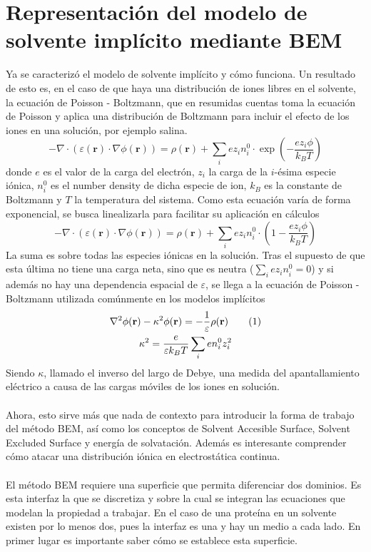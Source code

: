 \documentclass[12pt, twoside, onehalfspace, numbers, spanish]{ezthesis}
\newcommand\numberthis{\addtocounter{equation}{1}\tag{\theequation}}
\numberwithin{equation}{section}
\begin{document}
\section{Representación del modelo de solvente implícito mediante BEM}\label{Sec: Implicit_Solvent}
Ya se caracterizó el modelo de solvente implícito y cómo funciona. Un resultado de esto es, en el caso de que haya una distribución de iones libres en el solvente, la ecuación de Poisson - Boltzmann, que en resumidas cuentas toma la ecuación de Poisson y aplica una distribución de Boltzmann para incluir el efecto de los iones en una solución, por ejemplo salina.
\begin{equation}
-\nabla\cdot(\varepsilon(\mathbf{r})\cdot\nabla\phi(\mathbf{r})) = \rho(\mathbf{r}) + \sum_i ez_in_i^0\cdot \exp\left(-\frac{ez_i\phi}{k_BT}\right)
\end{equation}
donde $e$ es el valor de la carga del electrón, $z_i$ la carga de la $i$-ésima especie iónica, $n_i^0$ es el number density de dicha especie de ion, $k_B$ es la constante de Boltzmann y $T$ la temperatura del sistema. Como esta ecuación varía de forma exponencial, se busca linealizarla para facilitar su aplicación en cálculos
\begin{equation}
-\nabla\cdot(\varepsilon(\mathbf{r})\cdot\nabla\phi(\mathbf{r})) = \rho(\mathbf{r}) + \sum_i ez_in_i^0\cdot \left(1 - \frac{ez_i\phi}{k_BT}\right)
\end{equation}
La suma es sobre todas las especies iónicas en la solución. Tras el supuesto de que esta última no tiene una carga neta, sino que es neutra ($\sum_i ez_in_i^0 = 0$) y si además no hay una dependencia espacial de $\varepsilon$, se llega a la ecuación de Poisson - Boltzmann utilizada comúnmente en los modelos implícitos
\begin{gather*}
\nabla^2\phi(\mathbf{r}) - \kappa^2\phi(\mathbf{r}) = - \frac{1}{\varepsilon}\rho(\mathbf{r})\numberthis \\
\kappa^2 = \frac{e}{\varepsilon k_BT}\sum_i en_i^0z_i^2
\end{gather*}
Siendo $\kappa$, llamado el inverso del largo de Debye, una medida del apantallamiento eléctrico a causa de las cargas móviles de los iones en solución.\\\\
Ahora, esto sirve más que nada de contexto para introducir la forma de trabajo del método BEM, así como los conceptos de Solvent Accesible Surface, Solvent Excluded Surface y energía de solvatación. Además es interesante comprender cómo atacar una distribución iónica en electrostática continua.\\\\
El método BEM requiere una superficie que permita diferenciar dos dominios. Es esta interfaz la que se discretiza y sobre la cual se integran las ecuaciones que modelan la propiedad a trabajar. En el caso de una proteína en un solvente existen por lo menos dos, pues la interfaz es una y hay un medio a cada lado. En primer lugar es importante saber cómo se establece esta superficie.
\end{document}
